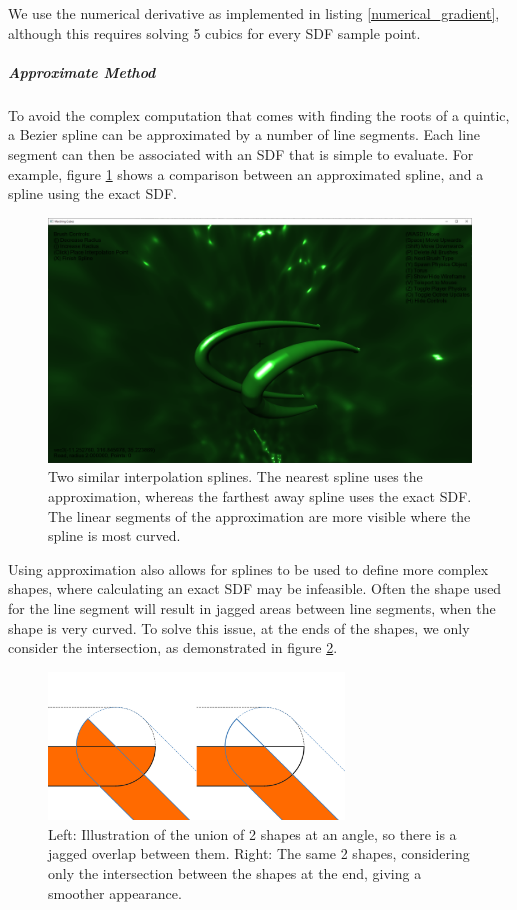 \documentclass[11pt]{article}
\begin{document}
We use the numerical derivative as implemented in listing \ref{numerical_gradient}, although this requires solving 5 cubics for every SDF sample point.

\subparagraph{Approximate Method}
To avoid the complex computation that comes with finding the roots of a quintic, a Bezier spline can be approximated by a number of line segments. Each line segment can then be associated with an SDF that is simple to evaluate. For example, figure \ref{fig:spline_approximation} shows a comparison between an approximated spline, and a spline using the exact SDF.
\begin{figure}[H]
  \includegraphics[width=\textwidth]{spline_approximation_2.png}
  \caption{Two similar interpolation splines. The nearest spline uses the approximation, whereas the farthest away spline uses the exact SDF. The linear segments of the approximation are more visible where the spline is most curved.}
  \label{fig:spline_approximation}
\end{figure}

Using approximation also allows for splines to be used to define more complex shapes, where calculating an exact SDF may be infeasible. Often the shape used for the line segment will result in jagged areas between line segments, when the shape is very curved. To solve this issue, at the ends of the shapes, we only consider the intersection, as demonstrated in figure \ref{fig:road_double}. 


\begin{figure}[H]
  \caption{Left: Illustration of the union of 2 shapes at an angle, so there is a jagged overlap between them. Right: The same 2 shapes, considering only the intersection between the shapes at the end, giving a smoother appearance.}
  \begin{center}
  \includegraphics[width=0.7\textwidth]{road_double.png}
  \end{center}
  \label{fig:road_double}
\end{figure}
\end{document}
